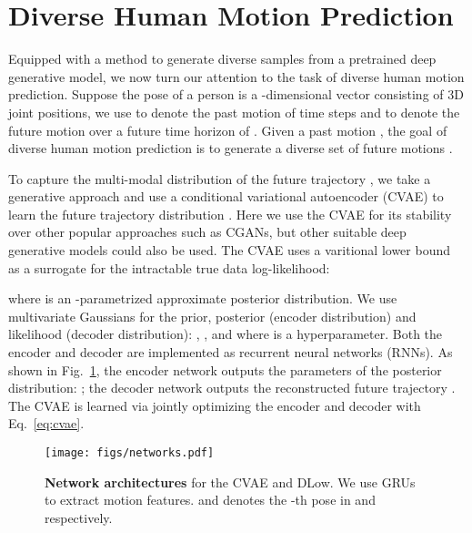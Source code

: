 \documentclass[runningheads]{llncs}
\begin{document}
	
	
	\section{Diverse Human Motion Prediction}
	\label{sec:motion_pred}
	
	Equipped with a method to generate diverse samples from a pretrained deep generative model, we now turn our attention to the task of diverse human motion prediction.
	Suppose the pose of a person is a -dimensional vector consisting of 3D joint positions, we use  to denote the past motion of  time steps and  to denote the future motion over a future time horizon of . Given a past motion , the goal of diverse human motion prediction is to generate a diverse set of future motions .
	
	To capture the multi-modal distribution of the future trajectory , we take a generative approach and use a conditional variational autoencoder (CVAE) to learn the future trajectory distribution . Here we use the CVAE for its stability over other popular approaches such as CGANs, but other suitable deep generative models could also be used. The CVAE uses a varitional lower bound~\cite{jordan1999introduction} as a surrogate for the intractable true data log-likelihood:
	
	where  is an -parametrized approximate posterior distribution.
	We use multivariate Gaussians for the prior, posterior (encoder distribution) and likelihood (decoder distribution): ,  , and  where  is a hyperparameter.
	Both the encoder and decoder are implemented as recurrent neural networks (RNNs). As shown in Fig.~\ref{fig:network}, the encoder network  outputs the parameters of the posterior distribution: ; the decoder network  outputs the reconstructed future trajectory . The CVAE is learned via jointly optimizing the encoder and decoder with Eq.~\eqref{eq:cvae}.
	
	\begin{figure}[t]
		\centering
		\texttt{[image: figs/networks.pdf]}
		\vspace{-7mm}
		\caption{\textbf{Network architectures} for the CVAE and DLow. We use GRUs~\cite{chung2014empirical} to extract motion features.  and  denotes the -th pose in  and  respectively.}
		\label{fig:network}
		\vspace{-5mm}
	\end{figure}
	
\end{document}
